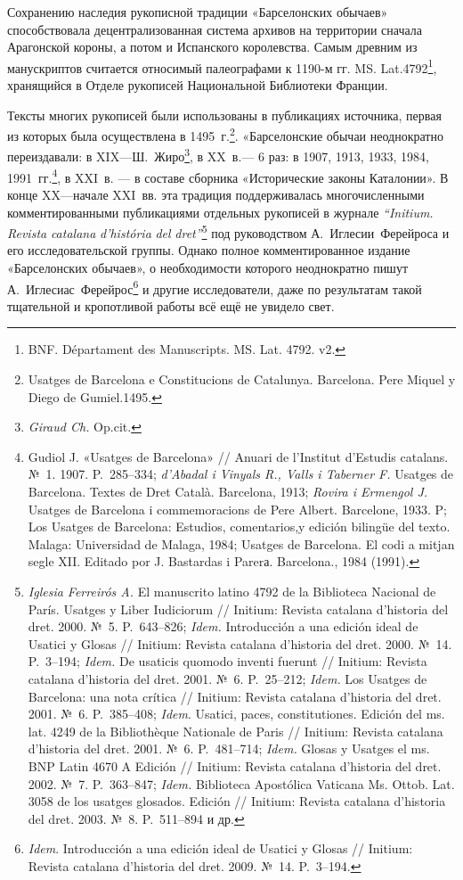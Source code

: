 Сохранению наследия рукописной традиции «Барселонских обычаев» способствовала децентрализованная система архивов на территории сначала Арагонской короны, а потом и Испанского королевства. Самым древним из манускриптов считается относимый палеографами к 1190-м гг. MS. Lat.4792\footnote{BNF. Départament des Manuscripts. MS. Lat. 4792. v2.}, хранящийся в Отделе рукописей Национальной Библиотеки Франции.

Тексты многих рукописей были использованы в публикациях источника, первая из которых была осуществлена в 1495~г.\footnote{Usatges de Barcelona e Constitucions de Catalunya. Barcelona. Pere Miquel y Diego de Gumiel.1495.}. «Барселонские обычаи неоднократно переиздавали: в XIX---Ш.~Жиро\footnote{\emph{Giraud Ch. }Op.cit.}, в XX~в.--- 6 раз: в 1907, 1913, 1933, 1984, 1991~гг.\footnote{Gudiol J. «Usatges de Barcelona» // Anuari de l’Institut d’Estudis catalans. №~1. 1907. P.~285--334; \emph{d’Abadal i Vinyals R., Valls i Taberner F.} Usatges de Barcelona. Textes de Dret Català. Barcelona, 1913; \emph{Rovira i Ermengol J. }Usatges de Barcelona i commemoracions de Pere Albert. Barcelone, 1933. P; Los Usatges de Barcelona: Estudios, comentarios,y edición bilingüe del texto. Malaga: Universidad de Malaga, 1984; Usatges de Barcelona. El codi a mitjan segle XII. Editado por J. Bastardas i Parerа. Barcelona., 1984 (1991).}, в XXI~в. --- в составе сборника «Исторические законы Каталонии». В конце XX---начале XXI~вв. эта традиция поддерживалась многочисленными комментированными публикациями отдельных рукописей в журнале \emph{“}\emph{Initium}\emph{. }\emph{Revista}\emph{ }\emph{catalana}\emph{ }\emph{d}\emph{'}\emph{hist}\emph{ó}\emph{ria}\emph{ }\emph{del}\emph{ }\emph{dret}\emph{”}\footnote{\emph{Iglesia Ferreirós A.} El manuscrito latino 4792 de la Biblioteca Nacional de París. Usatges y Liber Iudiciorum // Initium: Revista catalana d’historia del dret. 2000. №~5. P.~643--826;\emph{ Idem.} Introducción a una edición ideal de Usatici y Glosas // Initium: Revista catalana d’historia del dret. 2000. №~14. P.~3--194; \emph{Idem.} De usaticis quomodo inventi fuerunt // Initium: Revista catalana d’historia del dret. 2001. №~6. P.~25--212;\emph{ Idem. }Los Usatges de Barcelona: una nota crítica // Initium: Revista catalana d’historia del dret. 2001. №~6. P.~385--408; \emph{Idem}. Usatici, paces, constitutiones. Edición del ms. lat. 4249 de la Bibliothèque Nationale de Paris // Initium: Revista catalana d’historia del dret. 2001. №~6. P.~481--714; \emph{Idem. }Glosas y Usatges el ms. BNP Latin 4670 A Edición // Initium: Revista catalana d’historia del dret. 2002. №~7. P.~363--847; \emph{Idem. }Biblioteca Apostólica Vaticana Ms. Ottob. Lat. 3058 de los usatges glosados. Edición // Initium: Revista catalana d’historia del dret. 2003. №~8. P.~511--894 и др.}\emph{ }под руководством А.~Иглесии~Ферейроса и его исследовательской группы. Однако полное комментированное издание «Барселонских обычаев», о необходимости которого неоднократно пишут А.~Иглесиас~Ферейрос\footnote{\emph{Idem}. Introducción a una edición ideal de Usatici y Glosas // Initium: Revista catalana d’historia del dret. 2009. №~14. P.~3--194.} и другие исследователи, даже по результатам такой тщательной и кропотливой работы всё ещё не увидело свет.

